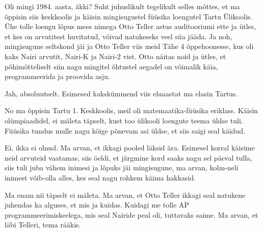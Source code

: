 

Oli mingi 1984. aasta, äkki? Suht juhuslikult tegelikult selles mõttes, et ma 
õppisin siis keskkoolis ja käisin mingisugustel füüsika loengutel Tartu 
Ülikoolis. Ühe tolle loengu lõpus mees nimega Otto 
Teller astus auditooriumi ette ja ütles, et kes on 
arvutitest huvitatud, võivad natukeseks veel  siia jääda. Ja noh, mingisugune 
seltskond jäi ja Otto Teller viis meid Tähe 4  
õppehoonesse, kus oli kaks Nairi arvutit, 
Nairi-K ja Nairi-2 vist. 
Otto näitas noid ja ütles, et põhimõtteliselt siin nagu mingitel õhtustel 
aegadel on võimalik käia, programmeerida ja proovida asju.


Jah, absoluutselt. Esimesed kakskümmend viis eluaastat ma elasin Tartus. 


No ma õppisin Tartu 1. Keskkoolis, meil oli 
matemaatika-füüsika eriklass. Käisin olümpiaadidel, ei mäleta täpselt, 
kust too ülikooli loengute teema üldse tuli. Füüsika tundus mulle nagu kõige 
põnevam asi üldse, et siis  saigi seal käidud.


Ei, ikka ei olnud. Ma arvan, et ikkagi pooled läksid ära. Esimesel korral 
käisime neid arvuteid vaatamas, siis öeldi, et järgmine kord saaks nagu sel 
päeval tulla, siis tuli juba vähem inimesi ja lõpuks jäi mingisugune, ma arvan, 
kolm-neli inimest võib-olla alles, kes seal nagu rohkem käima hakkasid.


Ma enam nii täpselt ei mäleta. Ma arvan, et Otto Teller ikkagi seal natukene juhendas ka alguses, et mis ja kuidas. Kuidagi me 
tolle AP 
programmeerimiskeelega, mis seal Nairide  peal oli, tuttavaks saime. Ma arvan, et läbi 
Telleri, tema rääkis.

